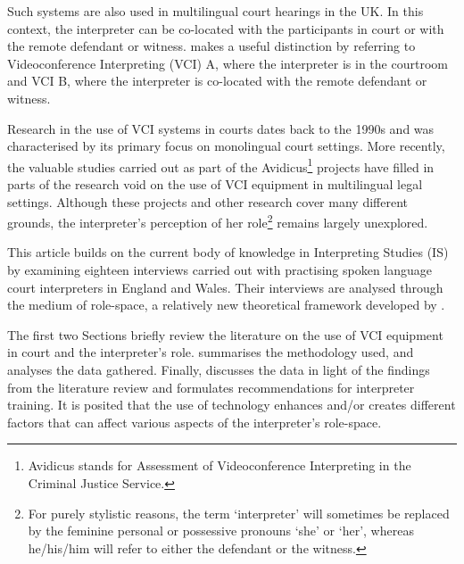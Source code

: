 \documentclass[output=paper]{langsci/langscibook}
\begin{document}
Such systems are also used in multilingual court hearings in the UK. In this context, the interpreter can be co-located with the participants in court or with the remote defendant or witness. \citet{Braun2011a} makes a useful distinction by referring to Videoconference Interpreting (\textsc{VCI}) A, where the interpreter is in the courtroom and \textsc{VCI} B, where the interpreter is co-located with the remote defendant or witness. 

Research in the use of \textsc{VCI} systems in courts dates back to the 1990s and was characterised by its primary focus on monolingual court settings. More recently, the valuable studies carried out as part of the Avidicus\footnote{Avidicus stands for Assessment of Videoconference Interpreting in the Criminal Justice Service.}  projects have filled in parts of the research void on the use of \textsc{VCI} equipment in multilingual legal settings. Although these projects and other research cover many different grounds, the interpreter’s perception of her role\footnote{For purely stylistic reasons, the term ‘interpreter’ will sometimes be replaced by the feminine personal or possessive pronouns ‘she’ or ‘her’, whereas he/his/him will refer to either the defendant or the witness.} remains largely unexplored. 

This article builds on the current body of knowledge in Interpreting Studies (IS) by examining eighteen interviews carried out with practising spoken language court interpreters in England and Wales. Their interviews are analysed through the medium of role-space, a relatively new theoretical framework developed by \citet{Llewellyn-Jones2014}.

The first two Sections briefly review the literature on the use of \textsc{VCI} equipment in court and the interpreter’s role.  summarises the methodology used, and  analyses the data gathered. Finally,  discusses the data in light of the findings from the literature review and formulates recommendations for interpreter training. It is posited that the use of technology enhances and/or creates different factors that can affect various aspects of the interpreter’s role-space.  
\end{document}

